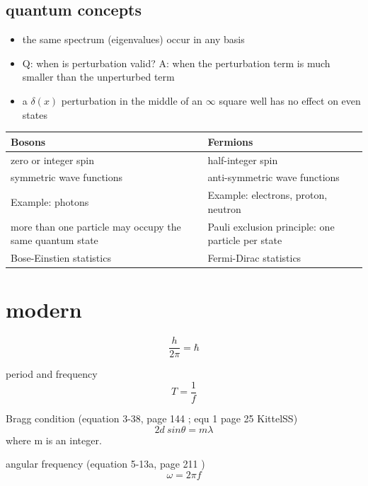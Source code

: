 \documentclass[12pt]{article}  %
\begin{document}
\subsection{quantum concepts}
\begin{itemize}
	\item the same spectrum (eigenvalues) occur in any basis
	\item Q: when is perturbation valid? A: when the perturbation term is 
	much smaller than the unperturbed term
	\item a $\delta(x)$ perturbation in the middle of an $\infty$ square well
	has no effect on even states
\end{itemize}

\begin{tabular}{l|l}
Bosons                &     Fermions \\\hline
zero or integer spin  &  half-integer spin\\
symmetric wave functions & anti-symmetric wave functions\\
Example: photons         & Example: electrons, proton, neutron\\
more than one particle may occupy the same quantum state & Pauli exclusion principle: one particle per state\\
Bose-Einstien statistics & Fermi-Dirac statistics\\
\end{tabular}

\section{modern}

\begin{equation}
\frac{h}{2 \pi} = \hbar
\end{equation}

period and frequency
\begin{equation}
T = \frac{1}{f}
\end{equation}

Bragg condition (equation 3-38, page 144 \cite{TiplerMP}; equ 1 page 25 {KittelSS})
\begin{equation}
2 d \ sin \theta  = m \lambda
\end{equation}
where m is an integer.

angular frequency (equation 5-13a, page 211 \cite{TiplerMP})
\begin{equation}
\omega = 2 \pi f
\end{equation}
\end{document}
